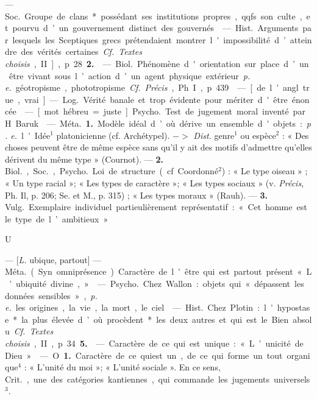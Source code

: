 \begin{itemize}[leftmargin=1cm, label=, itemsep=1pt]
 — \si{Soc.} Groupe de clans* possédant ses institutions propres, qqfs.
son culte, et pourvu d’un gouvernement distinct des gouvernés.

 — \si{Hist.} Arguments par lesquels les Sceptiques grecs prétendaient montrer l'impossibilité d’atteindre des vérités certaines. {\it Cf.}
{\it Textes choisis}, II], p. 28 {\bf 2.}

 — \si{Biol.} Phénomène d'orientation sur place d’un être vivant
sous l’action d’un agent physique
extérieur {\it p. e.} géotropisme, phototropisme. {\it Cf.} {\it Précis}, Ph. I,
p. 439.

 — [de l’angl. true, vrai] — \si{Log.}
Vérité banale et trop évidente pour
mériter d'être énoncée.

 — [mot hébreu = juste] \si{Psycho.}
Test de jugement moral inventé
par H. Baruk.

 — \si{Méta.} {\bf 1.} Modèle idéal d’où
dérive un ensemble d'objets : {\it p. e.}
l’Idée$^1$ platonicienne (cf. Archétypel). $->$ {\it Dist.} genre$^1$ ou espèce$^2$ :
« Des choses peuvent être de même
espèce sans qu'il y ait des motifs
d'admettre qu'elles dérivent du
même type » (Cournot). — {\bf 2.} \si{Biol.},
\si{Soc.}, \si{Psycho.} Loi de structure (cf.
Coordonné$^2$) : « Le type oiseau » ; « Un
type racial »; « Les types de caractère »; « Les types sociaux » (v. {\it Précis},
Ph. Il, p. 206; Se. et M., p. 315) ;
« Les types moraux » (Rauh). —
 {\bf 3.} \si{Vulg.} Exemplaire individuel partieulièrement représentatif : « Cet
homme est le type de l’ambitieux. »

\begin{center}
U
\end{center}

 — [{\it L.} ubique, partout] — \si{Méta.}
(Syn. omniprésence). Caractère de
l'être qui est partout présent
« L’ubiquité divine, »

 — \si{Psycho.} Chez Wallon :
objets qui « dépassent les données
sensibles », {\it p. e.} les origines, la vie, la
mort, le ciel.

 — \si{Hist.} Chez Plotin : l'hypostase* la plus élevée d’où procèdent*
les deux autres et qui est le Bien
absolu. {\it Cf.} {\it Textes choisis}, II, p. 34 {\bf 5.}

 — Caractère de ce qui est
unique : « L’unicité de Dieu. »

 — O {\bf 1.} Caractère de ce quiest un,
de ce qui forme un tout organique$^4$ :
« L'unité du moi »; « L'unité sociale ».
En ce sens, \si{Crit.}, une des catégories
kantiennes, qui commande les jugements universels$^3$.


\end{itemize}
